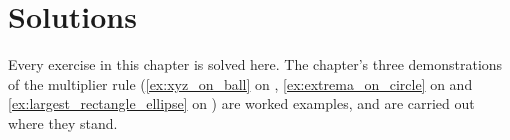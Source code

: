 
\section{Solutions}
\label{sec:lagrange_solutions}

Every exercise in this chapter is solved here. The chapter's three demonstrations of the
multiplier rule (\cref{ex:xyz_on_ball} on ,
\cref{ex:extrema_on_circle} on  and
\cref{ex:largest_rectangle_ellipse} on ) are worked
examples, and are carried out where they stand.

